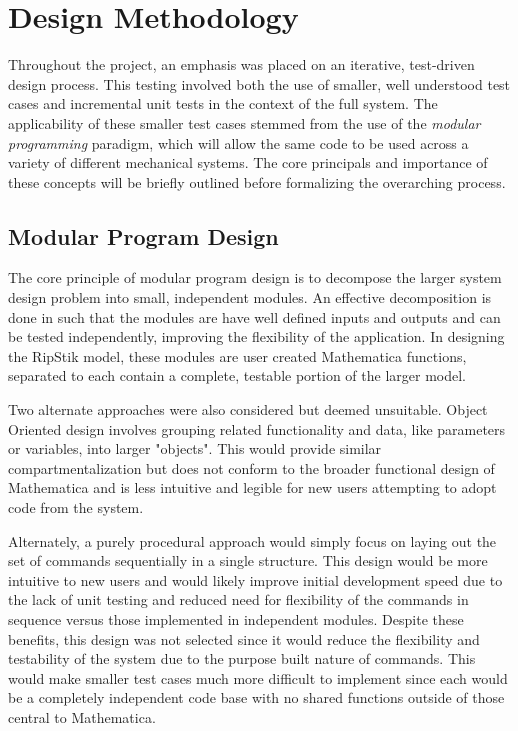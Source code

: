 \section{Design Methodology}
Throughout the project, an emphasis was placed on an iterative, test-driven design process. This testing involved both the use of smaller, well understood test cases and incremental unit tests in the context of the full system. 
The applicability of these smaller test cases stemmed from the use of the \textit{modular programming} paradigm, which will allow the same code to be used across a variety of different mechanical systems. 
The core principals and importance of these concepts will be briefly outlined before formalizing the overarching process.
\subsection{Modular Program Design}
The core principle of modular program design is to decompose the larger system design problem into small, independent modules\cite{Modular}.
An effective decomposition is done in such that the modules are have well defined inputs and outputs and can be tested independently, improving the flexibility of the application\cite{Modular}.
In designing the RipStik model, these modules are user created Mathematica functions, separated to each contain a complete, testable portion of the larger model.

Two alternate approaches were also considered but deemed unsuitable. Object Oriented design involves grouping related functionality and data, like parameters or variables, into larger "objects"\cite{ObjectOriented}.
This would provide similar compartmentalization \cite{ObjectOriented} but does not conform to the broader functional design of Mathematica \cite{MathematicaFunctional} and is less intuitive and legible for new users attempting to adopt code from the system. 

Alternately, a purely procedural approach would simply focus on laying out the set of commands sequentially in a single structure. 
This design would be more intuitive to new users and would likely improve initial development speed due to the lack of unit testing and reduced need for flexibility of the commands in sequence versus those implemented in independent modules.
Despite these benefits, this design was not selected since it would reduce the flexibility and testability of the system due to the purpose built nature of commands. 
This would make smaller test cases much more difficult to implement since each would be a completely independent code base with no shared functions outside of those central to Mathematica.
